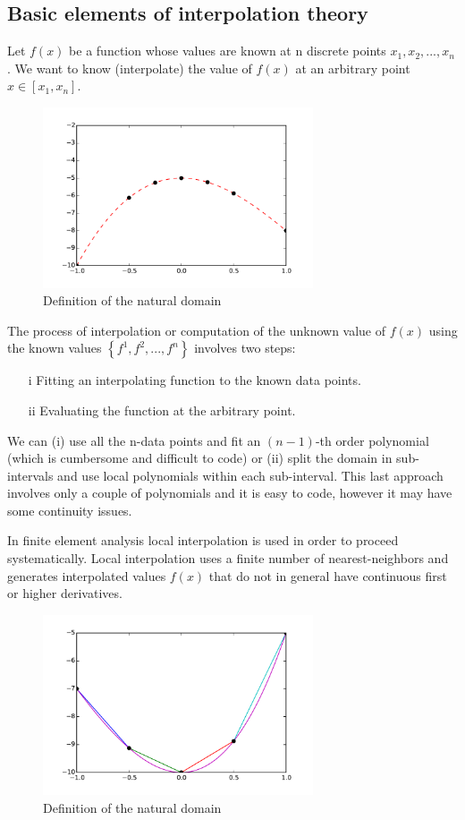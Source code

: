 \subsection{Basic elements of interpolation theory}
Let $f(x)$ be a function whose values are known at n discrete points ${x_1, x_2,...,x_n}$. We want to know (interpolate) the value of $f(x)$ at an arbitrary point $x \in \left[ {{x_1},{x_n}} \right]$.

\begin{figure}[h]
\centering
\includegraphics[width=8cm]{img/interpol1.pdf}
\caption{Definition of the natural domain}
\label{fig:interpol1}
\end{figure}

The process of interpolation or computation of the unknown value of $f(x)$ using the known values $\left\{ {{f^1},{f^2},...,{f^n}} \right\}$ involves two steps:

\begin{itemize}
\item[i]  Fitting an interpolating function to the known data points.
\item[ii] Evaluating the function at the arbitrary point.
\end{itemize}

We can (i) use all the n-data points and fit an $(n-1)$-th order polynomial (which is cumbersome and difficult to code) or (ii) split the domain in sub-intervals and use local polynomials within each sub-interval. This last approach involves only a couple of polynomials and it is easy to code, however it may have some continuity issues.

In finite element analysis local interpolation is used in order to proceed systematically. Local interpolation uses a finite number of nearest-neighbors and generates interpolated values $f(x)$ that do not in general have continuous first or higher derivatives.

\begin{figure}[h]
\centering
\includegraphics[width=8cm]{img/interpol2.pdf}
\caption{Definition of the natural domain}
\label{fig:interpol2}
\end{figure}

